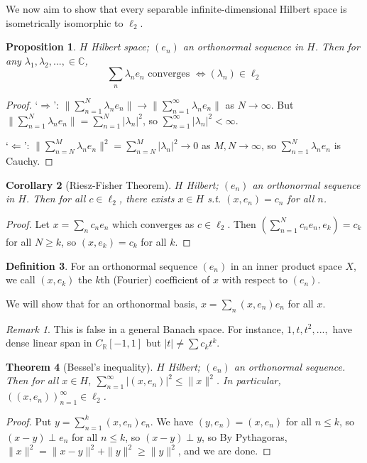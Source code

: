 \documentclass{article}
\theoremstyle{definition}
\newtheorem{defn}{Definition}[section]
\theoremstyle{remark}
\newtheorem{rem}{Remark}
\theoremstyle{plain}
\newtheorem{thm}[defn]{Theorem}
\newtheorem{prop}[defn]{Proposition}
\newtheorem{crly}[defn]{Corollary}
\newcommand{\RR}{\mathbb{R}}
\newcommand{\CC}{\mathbb{C}}
\begin{document}
We now aim to show that every separable infinite-dimensional Hilbert space is isometrically isomorphic to $\ell_2$.
\begin{prop}
    $H$ Hilbert space; $(e_n)$ an orthonormal sequence in $H$. Then for any $\lambda_1,\lambda_2,...,\in\CC$,
    \[\sum_n\lambda_ne_n\text{ converges }\Leftrightarrow (\lambda_n)\in\ell_2\]
\end{prop}
\begin{proof}
    `$\Rightarrow$': $\|\sum_{n=1}^N\lambda_ne_n\|\to \|\sum_{n=1}^\infty\lambda_ne_n\|$ as $N\to \infty$. But $\|\sum_{n=1}^N\lambda_ne_n\|=\sum_{n=1}^N|\lambda_n|^2$, so $\sum_{n=1}^\infty|\lambda_n|^2<\infty$.

    `$\Leftarrow$': $\|\sum_{n=N}^M\lambda_ne_n\|^2=\sum_{n=N}^M|\lambda_n|^2\to 0$ as $M,N\to \infty$, so $\sum_{n=1}^N\lambda_ne_n$ is Cauchy.
\end{proof}
\begin{crly}[Riesz-Fisher Theorem]
    $H$ Hilbert; $(e_n)$ an orthonormal sequence in $H$. Then for all $c\in \ell_2$, there exists $x\in H$ s.t. $(x,e_n)=c_n$ for all $n$.
\end{crly}
\begin{proof}
    Let $x=\sum_nc_ne_n$ which converges as $c\in \ell_2$. Then $(\sum_{n=1}^Nc_ne_n,e_k)=c_k$ for all $N\ge k$, so $(x,e_k)=c_k$ for all $k$.
\end{proof}
\begin{defn}
    For an orthonormal sequence $(e_n)$ in an inner product space $X$, we call $(x,e_k)$ the $k$th (Fourier) coefficient of $x$ with respect to $(e_n)$.
\end{defn}
We will show that for an orthonormal basis, $x=\sum_n(x,e_n)e_n$ for all $x$. 
\begin{rem}
    This is false in a general Banach space. For instance, $1,t,t^2,...,$ have dense linear span in $C_\RR[-1,1]$ but $|t|\neq \sum c_kt^k$.
\end{rem}
\begin{thm}[Bessel's inequality]
    $H$ Hilbert; $(e_n)$ an orthonormal sequence. Then for all $x\in H$, $\sum_{n=1}^\infty|(x,e_n)|^2\le \|x\|^2$. In particular, $((x,e_n))_{n=1}^\infty\in\ell_2$.
\end{thm}
\begin{proof}
    Put $y=\sum_{n=1}^k(x,e_n)e_n$. We have $(y,e_n)=(x,e_n)$ for all $n\le k$, so $(x-y)\perp e_n$ for all $n\le k$, so $(x-y)\perp y$, so By Pythagoras, $\|x\|^2=\|x-y\|^2+\|y\|^2\ge \|y\|^2$, and we are done.
\end{proof}
\end{document}
